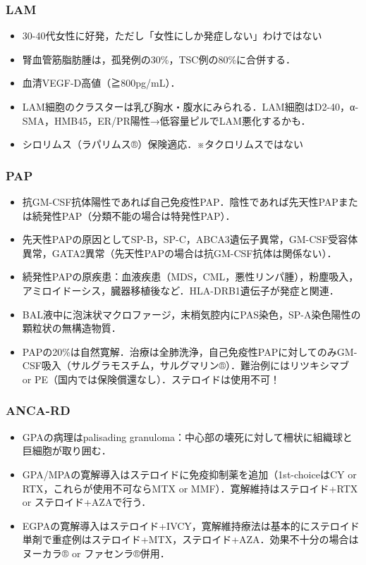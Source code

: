 \subsubsection{LAM}

\begin{itemize}
\item 30-40代女性に好発，ただし「女性にしか発症しない」わけではない
\item 腎血管筋脂肪腫は，孤発例の30\%，TSC例の80\%に合併する．
\item 血清VEGF-D高値（≧800pg/mL）．
\item LAM細胞のクラスターは乳び胸水・腹水にみられる．LAM細胞はD2-40，α-SMA，HMB45，ER/PR陽性→低容量ピルでLAM悪化するかも．
\item シロリムス（ラパリムス®）保険適応．※タクロリムスではない
\end{itemize}


\subsubsection{PAP}

\begin{itemize}
\item 抗GM-CSF抗体陽性であれば自己免疫性PAP．陰性であれば先天性PAPまたは続発性PAP（分類不能の場合は特発性PAP）．
\item 先天性PAPの原因としてSP-B，SP-C，ABCA3遺伝子異常，GM-CSF受容体異常，GATA2異常（先天性PAPの場合は抗GM-CSF抗体は関係ない）．
\item 続発性PAPの原疾患：血液疾患（MDS，CML，悪性リンパ腫），粉塵吸入，アミロイドーシス，臓器移植後など．HLA-DRB1遺伝子が発症と関連．
\item BAL液中に泡沫状マクロファージ，末梢気腔内にPAS染色，SP-A染色陽性の顆粒状の無構造物質．
\item PAPの20\%は自然寛解．治療は全肺洗浄，自己免疫性PAPに対してのみGM-CSF吸入（サルグラモスチム，サルグマリン®）．難治例にはリツキシマブ or PE（国内では保険償還なし）．ステロイドは使用不可！
\end{itemize}


\subsubsection{ANCA-RD}
\begin{itemize}
\item GPAの病理はpalisading granuloma：中心部の壊死に対して柵状に組織球と巨細胞が取り囲む．
\item GPA/MPAの寛解導入はステロイドに免疫抑制薬を追加（1st-choiceはCY or RTX，これらが使用不可ならMTX or MMF）．寛解維持はステロイド+RTX or ステロイド+AZAで行う．
\item EGPAの寛解導入はステロイド+IVCY，寛解維持療法は基本的にステロイド単剤で重症例はステロイド+MTX，ステロイド+AZA．効果不十分の場合はヌーカラ® or ファセンラ®併用．
\end{itemize}


